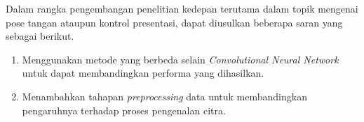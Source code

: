 Dalam rangka pengembangan penelitian kedepan terutama dalam topik mengenai pose tangan ataupun kontrol presentasi, dapat diusulkan beberapa saran yang sebagai berikut.

\begin{enumerate}[nolistsep]
  \item Menggunakan metode yang berbeda selain \emph{Convolutional Neural Network} untuk dapat membandingkan performa yang dihasilkan.
  \item Menambahkan tahapan \emph{preprocessing} data untuk membandingkan pengaruhnya terhadap proses pengenalan citra.
\end{enumerate} 
